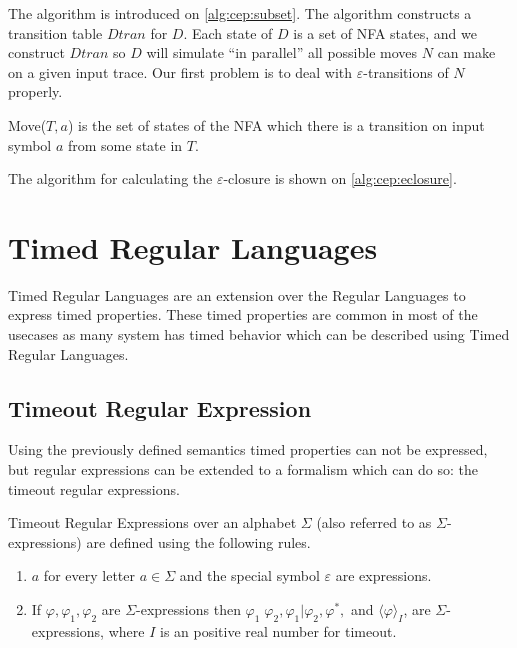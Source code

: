 			The algorithm is introduced on \cref{alg:cep:subset}.
			The algorithm constructs a transition table $\mathit{Dtran}$ for $D$. Each state of $D$ is a set of NFA states, and we construct $\mathit{Dtran}$ so $D$ will simulate ``in parallel'' all possible moves $N$ can make on a given input trace. Our first problem is to deal with $\varepsilon$-transitions of $N$ properly.
	
			Move($T,a$) is the set of states of the NFA which there is a transition on input symbol $a$ from some state in $T$.
			
			The algorithm for calculating the $\varepsilon$-closure is shown on \cref{alg:cep:eclosure}.
			
		\section{Timed Regular Languages}	
		
		Timed Regular Languages are an extension over the Regular Languages to express timed properties.
		These timed properties are common in most of the usecases as many system has timed behavior which can be described using Timed Regular Languages.
		
			\subsection{Timeout Regular Expression}
		
			Using the previously defined semantics timed properties can not be expressed, but regular expressions can be extended to a formalism which can do so: the timeout regular expressions.
			
			\begin{dfn}
				\label{dfn:cep:tre}
				Timeout Regular Expressions over an alphabet $\Sigma$ (also referred to as $\Sigma$-expressions)
				are defined using the following rules.
				\begin{enumerate}
					\item $a$ for every letter $a \in \Sigma$ and the special symbol $\varepsilon$ are expressions.
					\item If $\varphi, \varphi_1, \varphi_2$ are $\Sigma$-expressions then %
						$ %
						\varphi_1 \; \varphi_2,
						\varphi_1 | \varphi_2,
						\varphi^\ast,$ and 
						$\langle \varphi \rangle_I$, 
						are $\Sigma$-expressions, where $I$ is an positive real number for timeout. %
				\end{enumerate}
			\end{dfn}
	
